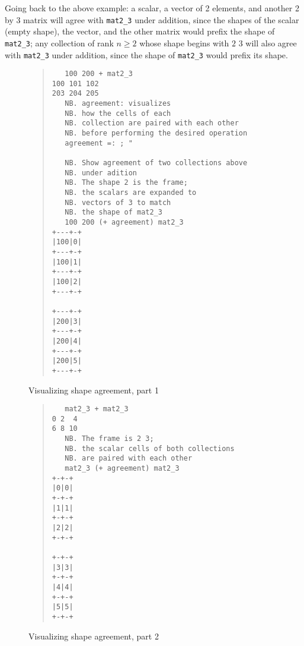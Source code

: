 Going back to the above example: 
a scalar, a vector of 2 elements, and another 2 by 3 matrix will agree with \texttt{mat2\_3} under addition, 
since the shapes of the scalar (empty shape), the vector, and the other matrix would prefix the shape of \texttt{mat2\_3}; 
any collection of rank $n \ge 2$ whose shape begins with $2$ $3$ will also agree with 
\texttt{mat2\_3} under addition, since the shape of \texttt{mat2\_3} would prefix its shape.

\begin{figure}[hp]
\begin{quote}
\begin{singlespacing}
\begin{small}
\begin{verbatim}
   100 200 + mat2_3
100 101 102
203 204 205
   NB. agreement: visualizes
   NB. how the cells of each 
   NB. collection are paired with each other
   NB. before performing the desired operation
   agreement =: ; "

   NB. Show agreement of two collections above
   NB. under adition
   NB. The shape 2 is the frame;
   NB. the scalars are expanded to
   NB. vectors of 3 to match 
   NB. the shape of mat2_3
   100 200 (+ agreement) mat2_3
+---+-+
|100|0|
+---+-+
|100|1|
+---+-+
|100|2|
+---+-+

+---+-+
|200|3|
+---+-+
|200|4|
+---+-+
|200|5|
+---+-+
\end{verbatim}
\end{small}
\end{singlespacing}
\end{quote}
\caption{Visualizing shape agreement, part 1}
\label{fig:agree1}
\end{figure}
%
\pagebreak
%
\begin{figure}[hp]
\begin{quote}
\begin{singlespacing}
\begin{small}
\begin{verbatim}
   mat2_3 + mat2_3
0 2  4
6 8 10
   NB. The frame is 2 3;
   NB. the scalar cells of both collections
   NB. are paired with each other
   mat2_3 (+ agreement) mat2_3
+-+-+
|0|0|
+-+-+
|1|1|
+-+-+
|2|2|
+-+-+

+-+-+
|3|3|
+-+-+
|4|4|
+-+-+
|5|5|
+-+-+
\end{verbatim}
\end{small}
\end{singlespacing}
\end{quote}
\caption{Visualizing shape agreement, part 2}
\label{fig:agree2}
\end{figure}
